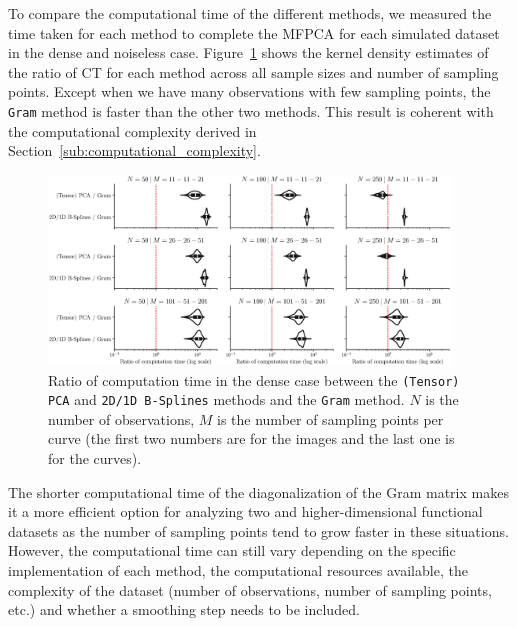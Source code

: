 \begin{results}
To compare the computational time of the different methods, we measured the time taken for each method to complete the MFPCA for each simulated dataset in the dense and noiseless case. Figure~\ref{fig:computation_time_mfd_1d} shows the kernel density estimates of the ratio of CT for each method across all sample sizes and number of sampling points. Except when we have many observations with few sampling points, the \texttt{Gram} method is faster than the other two methods. This result is coherent with the computational complexity derived in Section~\ref{sub:computational_complexity}.

\begin{figure}
     \centering
    \includegraphics[width=0.95\textwidth]{computation_time}
    \caption{Ratio of computation time in the dense case between the \texttt{(Tensor) PCA} and \texttt{2D/1D B-Splines} methods and the \texttt{Gram} method. $N$ is the number of observations, $M$ is the number of sampling points per curve (the first two numbers are for the images and the last one is for the curves).}
    \label{fig:computation_time_mfd_1d}
\end{figure}

The shorter computational time of the diagonalization of the Gram matrix makes it a more efficient option for analyzing two and higher-dimensional functional datasets as the number of sampling points tend to grow faster in these situations. However, the computational time can still vary depending on the specific implementation of each method, the computational resources available, the complexity of the dataset (number of observations, number of sampling points, etc.) and whether a smoothing step needs to be included.
\end{results}

